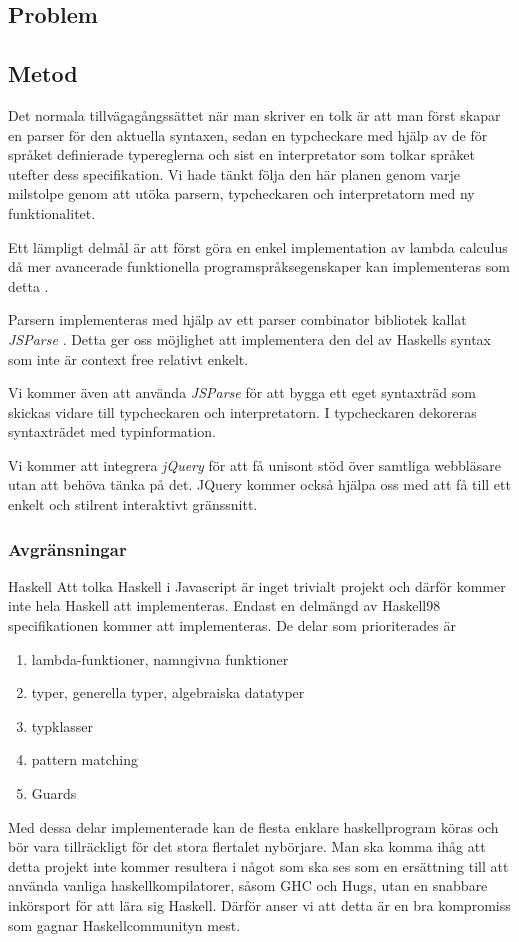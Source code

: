 \subsection{Problem} 

\subsection{Metod}
Det normala tillvägagångssättet när man skriver en tolk är att man först
skapar en parser för den aktuella syntaxen, sedan en typcheckare med 
hjälp av de för språket definierade typereglerna och sist en interpretator
som tolkar språket utefter dess specifikation. Vi hade tänkt följa den här planen genom varje milstolpe genom att utöka parsern, typcheckaren och interpretatorn med ny funktionalitet.

Ett lämpligt delmål är att först göra en enkel implementation av lambda calculus då mer avancerade funktionella programspråksegenskaper kan implementeras som detta \citep{jones87}.

 Parsern implementeras med hjälp av ett parser combinator bibliotek kallat \emph{JSParse} \citep{jsparse}. Detta ger oss möjlighet att implementera den del av Haskells syntax som inte är context free relativt enkelt.

Vi kommer även att använda \emph{JSParse} för att bygga ett eget syntaxträd som skickas vidare till typcheckaren och interpretatorn. I typcheckaren dekoreras syntaxträdet med typinformation.

Vi kommer att integrera \emph{jQuery} \citep{jquery} för att få unisont stöd över samtliga webbläsare utan att behöva tänka på det. JQuery kommer också hjälpa oss med att få till ett enkelt och stilrent interaktivt gränssnitt.

\subsubsection{Avgränsningar}
Haskell
Att tolka Haskell i Javascript är inget trivialt projekt och därför kommer inte hela Haskell att implementeras. 
Endast en delmängd av Haskell98 specifikationen kommer att implementeras. De delar som prioriterades är
        \begin{enumerate}
            \item{lambda-funktioner, namngivna funktioner}
            \item{typer, generella typer, algebraiska datatyper}
            \item{typklasser}
            \item{pattern matching}
            \item{Guards}
            \end{enumerate}
Med dessa delar implementerade kan de flesta enklare haskellprogram köras och bör vara tillräckligt för det stora flertalet nybörjare. Man ska komma ihåg att detta projekt inte kommer resultera i något som ska ses som en ersättning till att använda vanliga haskellkompilatorer, såsom GHC och Hugs, utan en snabbare inkörsport för att lära sig Haskell. Därför anser vi att detta är en bra kompromiss som gagnar Haskellcommunityn mest. %

